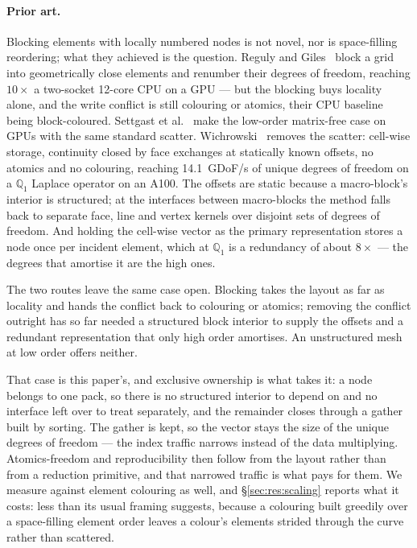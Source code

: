 \documentclass[sigconf,nonacm]{acmart}
\begin{document}
\paragraph{Prior art.} Blocking elements with locally numbered nodes is not novel, nor is
space-filling reordering; what they achieved is the question. Reguly and
Giles~\cite{RegulyGiles2015} block a grid into geometrically close elements and renumber their
degrees of freedom, reaching $10\times$ a two-socket 12-core CPU on a GPU --- but the blocking
buys locality alone, and the write conflict is still colouring or atomics, their CPU baseline
being block-coloured. Settgast et al.~\cite{Settgast2023} make the low-order matrix-free case on
GPUs with the same standard scatter. Wichrowski~\cite{Wichrowski2026} removes the scatter:
cell-wise storage, continuity closed by face exchanges at statically known offsets, no atomics
and no colouring, reaching \SI{14.1}{}~GDoF/s of unique degrees of freedom on a $\mathbb{Q}_1$
Laplace operator on an A100. The offsets are static because a macro-block's interior is
structured; at the interfaces between macro-blocks the method falls back to separate face, line
and vertex kernels over disjoint sets of degrees of freedom. And holding the cell-wise vector as
the primary representation stores a node once per incident element, which at $\mathbb{Q}_1$ is a
redundancy of about $8\times$ --- the degrees that amortise it are the high ones.

The two routes leave the same case open. Blocking takes the layout as far as locality and hands
the conflict back to colouring or atomics; removing the conflict outright has so far needed a
structured block interior to supply the offsets and a redundant representation that only high
order amortises. An unstructured mesh at low order offers neither.

That case is this paper's, and exclusive ownership is what takes it: a node belongs to one pack,
so there is no structured interior to depend on and no interface left over to treat separately,
and the remainder closes through a gather built by sorting. The gather is kept, so the vector
stays the size of the unique degrees of freedom --- the index traffic narrows instead of the
data multiplying. Atomics-freedom and reproducibility then follow from the layout rather than
from a reduction primitive, and that narrowed traffic is what pays for them. We measure against
element colouring as well, and \S\ref{sec:res:scaling} reports what it costs: less than its
usual framing suggests, because a colouring built greedily over a space-filling element order
leaves a colour's elements strided through the curve rather than scattered.
\end{document}
